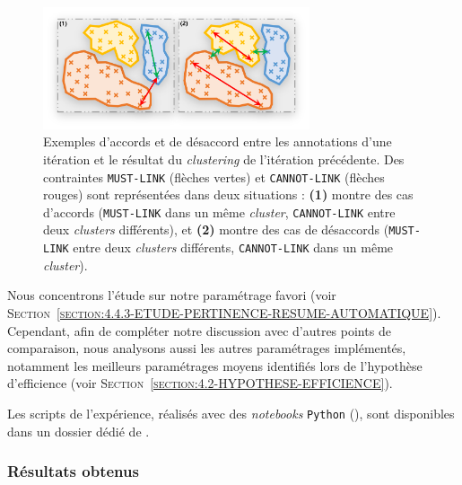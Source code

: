 			\begin{figure}[!htb]
				\centering
				\includegraphics[width=0.70\textwidth]{figures/example-accord-annotation-clustering}
				\caption{
					Exemples d'accords et de désaccord entre les annotations d'une itération et le résultat du \textit{clustering} de l'itération précédente.
					Des contraintes \texttt{MUST-LINK} (flèches vertes) et \texttt{CANNOT-LINK} (flèches rouges) sont représentées dans deux situations : \textbf{(1)} montre des cas d'accords (\texttt{MUST-LINK} dans un même \textit{cluster}, \texttt{CANNOT-LINK} entre deux \textit{clusters} différents), et \textbf{(2)} montre des cas de désaccords (\texttt{MUST-LINK} entre deux \textit{clusters} différents, \texttt{CANNOT-LINK} dans un même \textit{cluster}).
				}
				\label{figure:4.5.1-ETUDE-RENTABILITE-ACCORD-ANNOTATION-CLUSTERING-EXEMPLE}
			\end{figure}
			
			\begin{leftBarIdea}
				Nous concentrons l'étude sur notre paramétrage favori (voir \textsc{Section~\ref{section:4.4.3-ETUDE-PERTINENCE-RESUME-AUTOMATIQUE}}).
				Cependant, afin de compléter notre discussion avec d'autres points de comparaison, nous analysons aussi les autres paramétrages implémentés, notamment les meilleurs paramétrages moyens identifiés lors de l'hypothèse d'efficience (voir \textsc{Section~\ref{section:4.2-HYPOTHESE-EFFICIENCE}}).
			\end{leftBarIdea}
			
			\begin{leftBarInformation}
				Les scripts de l'expérience, réalisés avec des \textit{notebooks} \texttt{Python} (\cite{van-rossum-drake:2009:python-reference-manual}), sont disponibles dans un dossier dédié de \cite{schild:2021:cognitivefactory-interactiveclusteringcomparativestudy}.
			\end{leftBarInformation}

		\subsubsection{Résultats obtenus}
			
